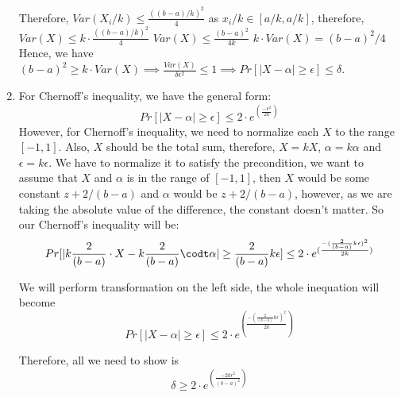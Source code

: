 \documentclass[11pt]{article}
\begin{document}
\begin{solution}
\begin{enumerate}
    Therefore, $Var(X_i/k) \leq \frac{((b-a)/k)^2}{4}$ as $x_i/k \in [a/k,a/k]$, therefore, $Var(X) \leq k \cdot \frac{((b-a)/k)^2}{4}$ \implies$Var(X) \leq \frac{(b-a)^2}{4k}$ \implies
    \newline
    $k \cdot Var(X) = (b-a)^2/4$
    \newline
    \newline
    Hence, we have $(b-a)^2 \geq k \cdot Var(X) \implies \frac{Var(X)}{\delta \epsilon ^2} \leq 1 \implies Pr[|X-\alpha| \geq \epsilon] \leq \delta$.
    \newpage
    \item   For Chernoff's inequality, we have the general form:
    $$Pr[|X - \alpha| \geq \epsilon] \leq 2 \cdot e^{(\frac {-\epsilon ^2}{2k})} $$ 
    However, for Chernoff's inequality, we need to normalize each $X$ to the range $[-1,1]$. Also, $X$ should be the total sum, therefore, $X = kX$, $\alpha = k\alpha$ and $\epsilon = k\epsilon$. We have to normalize it to satisfy the precondition, we want to assume that $X$ and $\alpha$ is in the range of $[-1,1]$, then $X$ would be some constant $z+2/(b-a)$ and $\alpha$ would be $z+ 2/(b-a)$, however, as we are taking the absolute value of the difference, the constant doesn't matter. So our Chernoff's inequality will be:
    $$ Pr[|k \frac{2}{(b-a)} \cdot X - k \frac{2}{(b-a)}\codt \alpha| \geq \frac{2}{(b-a)}k\epsilon] \leq 2 \cdot e^{(\frac {-(\frac{2}{(b-a)}k\epsilon)^2}{2k})} $$
    
    We will perform transformation on the left side, the whole inequation will become 
    $$ Pr[| X - \alpha|\geq \epsilon] \leq  2 \cdot e^{(\frac {-(\frac{2}{(b-a)}k\epsilon)^2}{2k})} $$
    

    Therefore, all we need to show is 
    $$ \delta \geq 2 \cdot e^{(\frac {-2k\epsilon^2}{(b-a)^2})} $$


\end{enumerate}
\end{solution}
\end{document}
